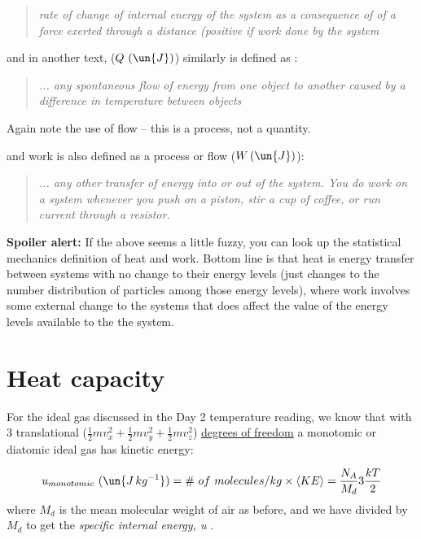 \documentclass[12pt]{article}
\begin{document}
\begin{quote}
  \textit{rate of change of internal energy of the system as a consequence of
of a force exerted through a distance (positive if work done by the system}
\end{quote}

\noindent
and in another text, ($Q\ (\un{J})$) similarly is defined as :

\begin{quote}
  \textit{... any spontaneous flow of energy from one object to another caused by a difference
  in temperature between objects}
\end{quote}
Again note the use of flow -- this is a process, not a quantity.

\noindent
and work is also defined as a process or flow ($W\, (\un{J})$):

\begin{quote}
  
  \textit{... any other transfer of energy into or out of the system.
    You do work on a system whenever you push on a piston, stir a cup
    of coffee, or run current through a resistor.}

\end{quote}

\textbf{Spoiler alert:} If the above seems a little fuzzy, you can
look up  the statistical mechanics
definition of heat and work.  Bottom line is
that heat is energy transfer between systems with no change to their
energy levels (just changes to the number distribution of particles
among those energy levels), where work involves some external change
to the systems that does affect the value of the energy levels
available to the the system.


\section{Heat capacity}
\label{sec:heat-capacity}


For the ideal gas discussed in the Day 2 temperature reading, we know that
with 3 translational ($\frac{1}{2}mv_x^2 + \frac{1}{2}mv_y^2 + \frac{1}{2}mv_z^2$)   
\href{http://en.wikipedia.org/wiki/Degrees_of_freedom_%28physics_and_chemistry%29}%
{degrees of freedom} a  monotomic or diatomic ideal gas has kinetic energy:

\begin{equation}
  \label{eq:Umono}
  u_{monotomic}\ (\un{J\,kg^{-1}})= \#\ of\ molecules/kg \times \left < KE \right >
  = \frac{N_A}{M_d} 3 \frac{k T }{2 } 
\end{equation}
where $M_d$ is the mean molecular weight of air as before, and we have
divided by $M_d$ to get the \textit{specific internal energy, u
  }.  
\end{document}

